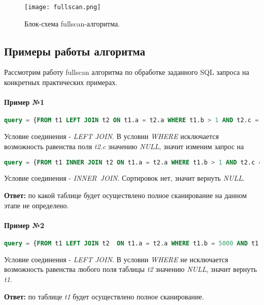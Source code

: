 \begin{figure}[h]
  \centering
  \texttt{[image: fullscan.png]}
  \caption{Блок-схема fullscan-алгоритма.}
  \label{img:fullscan}
\end{figure}


\subsection{Примеры работы алгоритма}

Рассмотрим работу fullscan алгоритма по обработке заданного SQL запроса на конкретных практических примерах.

\paragraph{Пример №1}

\begin{lstlisting}[language=SQL]
query = {FROM t1 LEFT JOIN t2 ON t1.a = t2.a WHERE t1.b > 1 AND t2.c = 5}
\end{lstlisting}

Условие соединения - \textit{LEFT JOIN}. В условии \textit{WHERE} исключается возможность равенства поля \textit{t2.c} значению \textit{NULL}, значит изменим запрос на
\begin{lstlisting}[language=SQL]
query = {FROM t1 INNER JOIN t2 ON t1.a = t2.a WHERE t1.b > 1 AND t2.c = 5}
\end{lstlisting}

Условие соединения - \textit{INNER JOIN}. Сортировок нет, значит вернуть \textit{NULL}. 

\textbf{Ответ:} по какой таблице будет осуществлено полное сканирование на данном этапе не определено.


\paragraph{Пример №2}
\begin{lstlisting}[language=SQL]
query = {FROM t1 LEFT JOIN t2  ON t1.a = t2.a WHERE t1.b = 5000 AND t1.c > 3 ORDER BY t2.c, t2.d}
\end{lstlisting}

Условие соединения - \textit{LEFT JOIN}. В условии \textit{WHERE} не исключается возможность равенства любого поля таблицы \textit{t2} значению \textit{NULL}, значит вернуть \textit{t1}.

\textbf{Ответ:} по таблице \textit{t1} будет осуществлено полное сканирование. 


